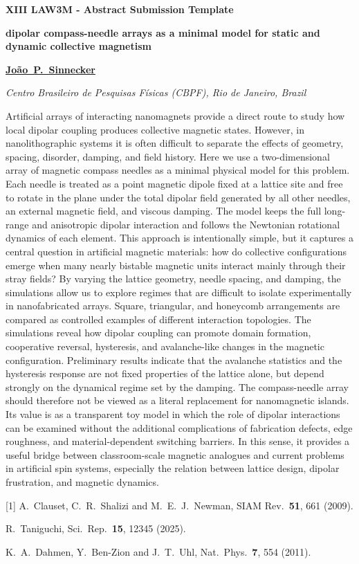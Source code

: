\documentclass[12pt,a4paper]{article}
\begin{document}
\begin{center}
{\bfseries\fontsize{14}{16}\selectfont XIII LAW3M - Abstract Submission Template}\par
\vspace{6pt}
{\bfseries\fontsize{14}{16}\selectfont dipolar compass-needle arrays as a minimal model for static and dynamic collective magnetism}\par
\vspace{10pt}
{\bfseries\fontsize{12}{14}\selectfont \uline{Jo\~ao~P.~Sinnecker}}\par
\vspace{6pt}
{\itshape\fontsize{12}{14}\selectfont Centro Brasileiro de Pesquisas F\'isicas (CBPF), Rio de Janeiro, Brazil}\par
\end{center}
\vspace{10pt}

Artificial arrays of interacting nanomagnets provide a direct route to study how local dipolar coupling produces collective magnetic states. However, in nanolithographic systems it is often difficult to separate the effects of geometry, spacing, disorder, damping, and field history. Here we use a two-dimensional array of magnetic compass needles as a minimal physical model for this problem. Each needle is treated as a point magnetic dipole fixed at a lattice site and free to rotate in the plane under the total dipolar field generated by all other needles, an external magnetic field, and viscous damping. The model keeps the full long-range and anisotropic dipolar interaction and follows the Newtonian rotational dynamics of each element. This approach is intentionally simple, but it captures a central question in artificial magnetic materials: how do collective configurations emerge when many nearly bistable magnetic units interact mainly through their stray fields? By varying the lattice geometry, needle spacing, and damping, the simulations allow us to explore regimes that are difficult to isolate experimentally in nanofabricated arrays. Square, triangular, and honeycomb arrangements are compared as controlled examples of different interaction topologies. The simulations reveal how dipolar coupling can promote domain formation, cooperative reversal, hysteresis, and avalanche-like changes in the magnetic configuration. Preliminary results indicate that the avalanche statistics and the hysteresis response are not fixed properties of the lattice alone, but depend strongly on the dynamical regime set by the damping. The compass-needle array should therefore not be viewed as a literal replacement for nanomagnetic islands. Its value is as a transparent toy model in which the role of dipolar interactions can be examined without the additional complications of fabrication defects, edge roughness, and material-dependent switching barriers. In this sense, it provides a useful bridge between classroom-scale magnetic analogues and current problems in artificial spin systems, especially the relation between lattice design, dipolar frustration, and magnetic dynamics.

{\small
[1] A.~Clauset, C.~R.~Shalizi and M.~E.~J.~Newman, SIAM Rev.\ \textbf{51}, 661 (2009).\par
[2] R.~Taniguchi, Sci.\ Rep.\ \textbf{15}, 12345 (2025).\par
[3] K.~A.~Dahmen, Y.~Ben-Zion and J.~T.~Uhl, Nat.\ Phys.\ \textbf{7}, 554 (2011).}
\end{document}
